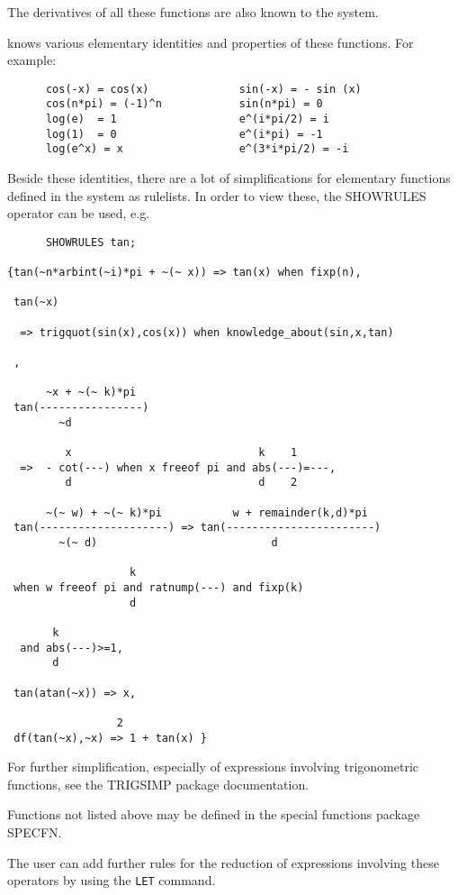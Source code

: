 The derivatives of all these functions are also known to the system.

{\REDUCE} knows various elementary identities and properties
of these functions. For example:
\begin{verbatim}
      cos(-x) = cos(x)              sin(-x) = - sin (x)
      cos(n*pi) = (-1)^n            sin(n*pi) = 0
      log(e)  = 1                   e^(i*pi/2) = i
      log(1)  = 0                   e^(i*pi) = -1
      log(e^x) = x                  e^(3*i*pi/2) = -i
\end{verbatim}

Beside these identities, there are a lot of simplifications
for elementary functions
defined in the {\REDUCE} system as rulelists. In order to
view these, the SHOWRULES operator can be used, e.g.

\begin{verbatim}
      SHOWRULES tan;

{tan(~n*arbint(~i)*pi + ~(~ x)) => tan(x) when fixp(n),

 tan(~x)

  => trigquot(sin(x),cos(x)) when knowledge_about(sin,x,tan)

 ,

      ~x + ~(~ k)*pi
 tan(----------------)
	    ~d

	     x                             k    1
  =>  - cot(---) when x freeof pi and abs(---)=---,
	     d                             d    2

      ~(~ w) + ~(~ k)*pi           w + remainder(k,d)*pi
 tan(--------------------) => tan(-----------------------)
	    ~(~ d)                           d

			       k
 when w freeof pi and ratnump(---) and fixp(k)
			       d

	   k
  and abs(---)>=1,
	   d

 tan(atan(~x)) => x,

			     2
 df(tan(~x),~x) => 1 + tan(x) }

\end{verbatim}

For further simplification, especially of expressions involving
trigonometric functions, see the TRIGSIMP package
documentation.

Functions not listed above may be defined in the special functions
package SPECFN.

The user can add further rules for the reduction of expressions involving
these operators by using the {\tt LET} command.

